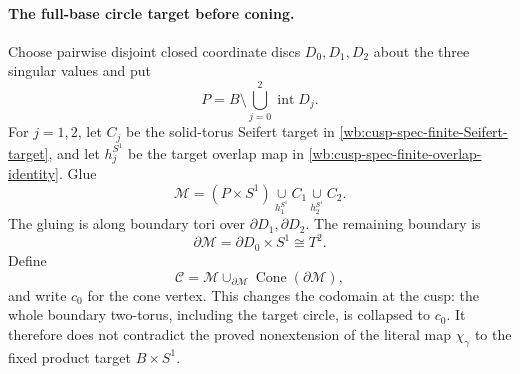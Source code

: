 \paragraph{The full-base circle target before coning.}
Choose pairwise disjoint closed coordinate discs \(D_0,D_1,D_2\) about the
three singular values and put
\begin{equation}
 P=B\setminus\bigcup_{j=0}^2\operatorname{int}D_j.
 \label{wb:cusp-cone-pair-of-pants}
\end{equation}
For \(j=1,2\), let \(C_j\) be the solid-torus Seifert target in
\cref{wb:cusp-spec-finite-Seifert-target}, and let \(h_j^{S^1}\) be the
target overlap map in \cref{wb:cusp-spec-finite-overlap-identity}.  Glue
\begin{equation}
 \mathcal M=(P\times S^1)
 \underset{h_1^{S^1}}{\cup}C_1
 \underset{h_2^{S^1}}{\cup}C_2.
 \label{wb:cusp-cone-M-definition}
\end{equation}
The gluing is along boundary tori over \(\partial D_1,\partial D_2\).
The remaining boundary is
\begin{equation}
 \partial\mathcal M=\partial D_0\times S^1\cong T^2.
 \label{wb:cusp-cone-M-boundary}
\end{equation}
Define
\begin{equation}
 \mathcal C=\mathcal M\cup_{\partial\mathcal M}
 \operatorname{Cone}(\partial\mathcal M),
 \label{wb:cusp-cone-C-definition}
\end{equation}
and write \(c_0\) for the cone vertex.
This changes the codomain at the cusp: the whole boundary two-torus,
including the target circle, is collapsed to \(c_0\).  It therefore does
not contradict the proved nonextension of the literal map
\(\chi_\gamma\) to the fixed product target \(B\times S^1\).

